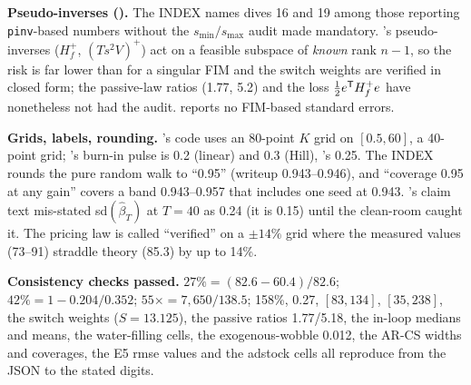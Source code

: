 \begin{reviewernote}[(compiler)]
\textbf{Pseudo-inverses ().} The INDEX names dives 16 and 19 among those reporting \texttt{pinv}-based numbers without the $s_{\min}/s_{\max}$ audit  made mandatory. 's pseudo-inverses ($H_f^+$, $(Ts^2V)^+$) act on a feasible subspace of \emph{known} rank $n - 1$, so the risk is far lower than for a singular FIM and the switch weights are verified in closed form; the passive-law ratios (1.77, 5.2) and the loss $\tfrac12e^{\mathsf{T}} H_f^+e$ have nonetheless not had the audit.  reports no FIM-based standard errors.

\textbf{Grids, labels, rounding.} 's code uses an 80-point $K$ grid on $[0.5, 60]$,  a 40-point grid; 's burn-in pulse is 0.2 (linear) and 0.3 (Hill), 's 0.25. The INDEX rounds the pure random walk to ``0.95'' (writeup 0.943--0.946), and ``coverage 0.95 at any gain'' covers a band 0.943--0.957 that includes one seed at 0.943. 's claim text mis-stated sd$(\hat\beta_T)$ at $T = 40$ as 0.24 (it is 0.15) until the clean-room caught it. The pricing law is called ``verified'' on a $\pm 14\%$ grid where the measured values (73--91) straddle theory (85.3) by up to 14\%.

\textbf{Consistency checks passed.} $27\% = (82.6 - 60.4)/82.6$; $42\% = 1 - 0.204/0.352$; $55\times = 7{,}650/138.5$; 158\%, 0.27, $[83, 134]$, $[35, 238]$, the switch weights ($S = 13.125$), the passive ratios 1.77/5.18, the in-loop medians and means, the water-filling cells, the exogenous-wobble 0.012, the AR-CS widths and coverages, the E5 rmse values and the adstock cells all reproduce from the JSON to the stated digits.
\end{reviewernote}

